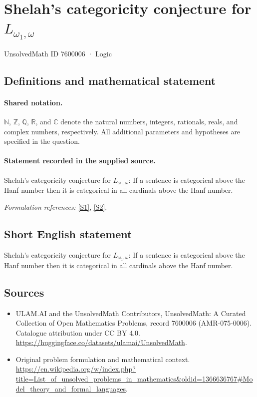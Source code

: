 \documentclass[11pt]{article}
\newcommand{\sref}[2]{\hyperlink{source:#1:#2}{[S#2]}}
\begin{document}
\setcounter{section}{7600005}
\section{\texorpdfstring{Shelah's categoricity conjecture for $L_{\omega_1,\omega}$}{Shelah's categoricity conjecture for L\_omega\_1,omega}}\label{7600006}
{\small UnsolvedMath ID 7600006 · Logic}
\subsection{Definitions and mathematical statement}

\paragraph{Shared notation.}$\mathbb N$, $\mathbb Z$, $\mathbb Q$, $\mathbb R$, and $\mathbb C$ denote the natural numbers, integers, rationals, reals, and complex numbers, respectively. All additional parameters and hypotheses are specified in the question.


\paragraph{Statement recorded in the supplied source.}
Shelah's categoricity conjecture for $L_{\omega_1,\omega}$: If a sentence is categorical above the Hanf number then it is categorical in all cardinals above the Hanf number.
\par\smallskip\textit{Formulation references:} \sref{7600006}{1}, \sref{7600006}{2}.
\subsection{Short English statement}
Shelah's categoricity conjecture for $L_{\omega_1,\omega}$: If a sentence is categorical above the Hanf number then it is categorical in all cardinals above the Hanf number.
\subsection{Sources}
\begin{itemize}
\item[\hypertarget{source:7600006:1}{S1}] ULAM.AI and the UnsolvedMath Contributors, UnsolvedMath: A Curated Collection of Open Mathematics Problems, record 7600006 (AMR-075-0006). Catalogue attribution under CC BY 4.0.
\url{https://huggingface.co/datasets/ulamai/UnsolvedMath}.
\item[\hypertarget{source:7600006:2}{S2}] Original problem formulation and mathematical context.
\url{https://en.wikipedia.org/w/index.php?title=List_of_unsolved_problems_in_mathematics&oldid=1366636767#Model_theory_and_formal_languages}.
\end{itemize}
\label{end:7600006}
\end{document}
